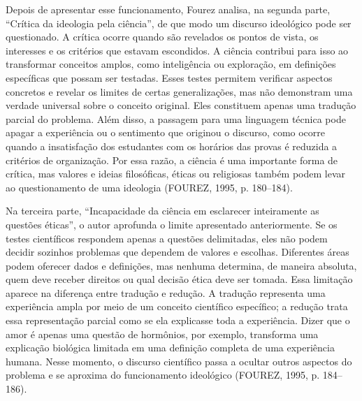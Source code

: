 \documentclass[12pt,a4paper]{article}
\begin{document}
Depois de apresentar esse funcionamento, Fourez analisa, na segunda parte,
``Crítica da ideologia pela ciência'', de que modo um discurso ideológico
pode ser questionado. A crítica ocorre quando são revelados os pontos de
vista, os interesses e os critérios que estavam escondidos. A ciência
contribui para isso ao transformar conceitos amplos, como inteligência ou
exploração, em definições específicas que possam ser testadas. Esses testes
permitem verificar aspectos concretos e revelar os limites de certas
generalizações, mas não demonstram uma verdade universal sobre o conceito
original. Eles constituem apenas uma tradução parcial do problema. Além
disso, a passagem para uma linguagem técnica pode apagar a experiência ou o
sentimento que originou o discurso, como ocorre quando a insatisfação dos
estudantes com os horários das provas é reduzida a critérios de organização.
Por essa razão, a ciência é uma importante forma de crítica, mas valores e
ideias filosóficas, éticas ou religiosas também podem levar ao
questionamento de uma ideologia (FOUREZ, 1995, p. 180--184).

Na terceira parte, ``Incapacidade da ciência em esclarecer inteiramente as
questões éticas'', o autor aprofunda o limite apresentado anteriormente. Se
os testes científicos respondem apenas a questões delimitadas, eles não
podem decidir sozinhos problemas que dependem de valores e escolhas.
Diferentes áreas podem oferecer dados e definições, mas nenhuma determina,
de maneira absoluta, quem deve receber direitos ou qual decisão ética deve
ser tomada. Essa limitação aparece na diferença entre tradução e redução. A
tradução representa uma experiência ampla por meio de um conceito científico
específico; a redução trata essa representação parcial como se ela explicasse
toda a experiência. Dizer que o amor é apenas uma questão de hormônios, por
exemplo, transforma uma explicação biológica limitada em uma definição
completa de uma experiência humana. Nesse momento, o discurso científico
passa a ocultar outros aspectos do problema e se aproxima do funcionamento
ideológico (FOUREZ, 1995, p. 184--186).
\end{document}
